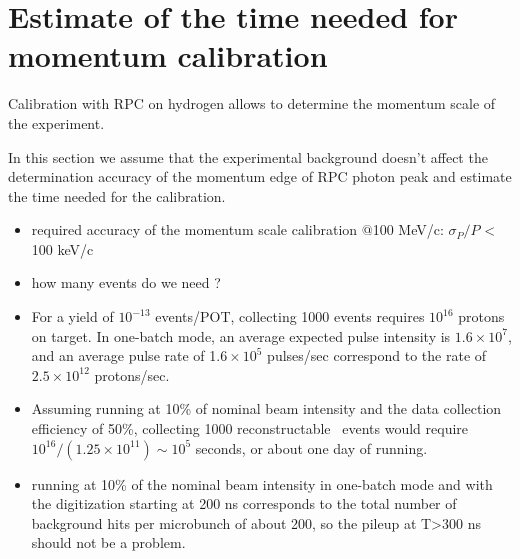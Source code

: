 \section{Estimate of the time needed for momentum calibration}
Calibration with RPC on hydrogen allows to determine the momentum scale of the experiment.

In this section we assume that the experimental background doesn't affect
the determination accuracy of the momentum edge of RPC photon peak
and estimate the time needed for the calibration.


\begin{itemize}
\item 
  required accuracy of the momentum scale calibration $@$100 MeV/c: $\sigma_P/P$ < 100 keV/c
\item
  {\red how many events do we need ?}
\item
  For a yield of $10^{-13}$ events/POT, collecting 1000 events requires $10^{16}$ protons on target.
  In one-batch mode, an average expected pulse intensity is $1.6 \times 10^7$, and
  an average  pulse rate of 1$.6 \times 10^5$ pulses/sec correspond to the rate of $2.5 \times 10^{12}$ protons/sec.
\item
  Assuming running at 10\% of nominal beam intensity and the data collection efficiency of 50\%,
  collecting 1000 reconstructable \piplusenu\ events would require
  $10^{16}/(1.25 \times 10^{11}) \sim 10^5$ seconds, or about one day of running.
\item
  running at 10\% of the nominal beam intensity in one-batch mode and with the digitization starting
  at 200 ns corresponds to the total number of background hits per microbunch of about 200,
  so the pileup at T>300 ns should not be a problem.
\end{itemize}

